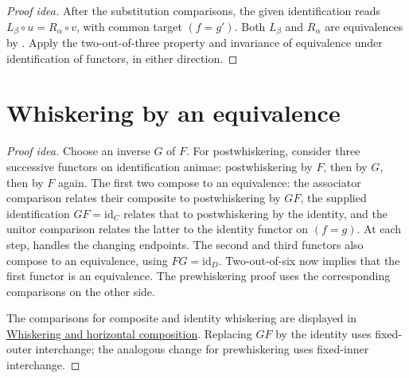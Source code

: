 \documentclass[11pt]{article}
\begin{document}
\begin{proof}[Proof idea]
After the substitution comparisons, the given identification reads
$L_\beta\circ u=R_\alpha\circ v$, with common target $(f=g')$.
Both $L_\beta$ and $R_\alpha$ are equivalences by
.
Apply the two-out-of-three property and invariance of equivalence under
identification of functors, in either direction.
\end{proof}

\section*{Whiskering by an equivalence}

\begin{proof}[Proof idea]
Choose an inverse $G$ of $F$. For postwhiskering, consider three successive
functors on identification animae: postwhiskering by $F$, then by $G$, then
by $F$ again. The first two compose to an equivalence: the associator
comparison relates their composite to postwhiskering by $GF$, the supplied
identification $GF=\mathrm{id}_C$ relates that to postwhiskering by the
identity, and the unitor comparison relates the latter to the identity
functor on $(f=g)$. At each step,
 handles the changing endpoints.
The second and third functors also compose to an equivalence, using
$FG=\mathrm{id}_D$. Two-out-of-six now implies that the first functor is
an equivalence. The prewhiskering proof uses the corresponding comparisons
on the other side.

The comparisons for composite and identity whiskering are displayed in
\href{supplementary-whiskering-and-horizontal-composition.html}{Whiskering and
horizontal composition}. Replacing $GF$ by the identity uses fixed-outer
interchange; the analogous change for prewhiskering uses fixed-inner
interchange.
\end{proof}
\end{document}
